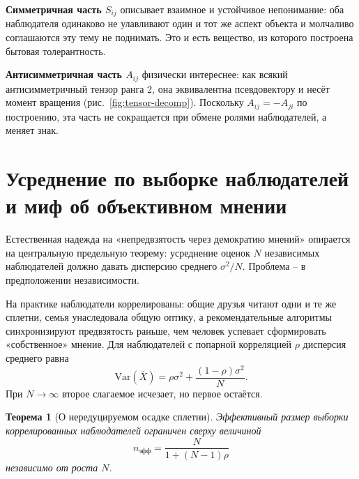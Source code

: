 \documentclass[11pt,a4paper]{article}
\newtheorem{theorem}{Теорема}
\begin{document}
\textbf{Симметричная часть $S_{ij}$} описывает взаимное и устойчивое непонимание: оба наблюдателя одинаково не улавливают один и тот же аспект объекта и молчаливо соглашаются эту тему не поднимать. Это и есть вещество, из которого построена бытовая толерантность.

\textbf{Антисимметричная часть $A_{ij}$} физически интереснее: как всякий антисимметричный тензор ранга 2, она эквивалентна псевдовектору и несёт момент вращения (рис.~\ref{fig:tensor-decomp}). Поскольку $A_{ij}=-A_{ji}$ по построению, эта часть не сокращается при обмене ролями наблюдателей, а меняет знак.

\section{Усреднение по выборке наблюдателей и миф об объективном мнении}

Естественная надежда на «непредвзятость через демократию мнений» опирается на центральную предельную теорему: усреднение оценок $N$ независимых наблюдателей должно давать дисперсию среднего $\sigma^2/N$. Проблема -- в предположении независимости.

На практике наблюдатели коррелированы: общие друзья читают одни и те же сплетни, семья унаследовала общую оптику, а рекомендательные алгоритмы синхронизируют предвзятость раньше, чем человек успевает сформировать «собственное» мнение. Для наблюдателей с попарной корреляцией $\rho$ дисперсия среднего равна
\[
\mathrm{Var}(\bar X) = \rho\sigma^2 + \frac{(1-\rho)\sigma^2}{N}.
\]
При $N\to\infty$ второе слагаемое исчезает, но первое остаётся.

\begin{theorem}[О нередуцируемом осадке сплетни]
Эффективный размер выборки коррелированных наблюдателей ограничен сверху величиной
\[
n_{\text{эфф}} = \frac{N}{1+(N-1)\rho}
\]
независимо от роста $N$.
\end{theorem}
\end{document}
